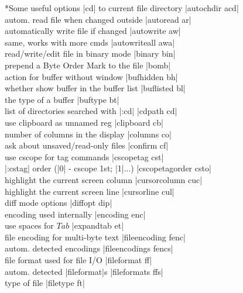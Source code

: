 \documentclass[10pt,a4paper,landscape]{article}
\makeatletter
\renewcommand{\subsection}{\@startsection
	{section}
	{4}
	{0mm}
	{1mm}
	{0.5mm}
	{\normalfont\bfseries\scriptsize}}
\makeatother
\begin{document}
\begin{multicols}{4}
\subsection*{Some useful options}
|cd| to current file directory			\dotfill|autochdir acd|\\
autom. read file when changed outside		\dotfill|autoread ar|\\
automatically write file if changed		\dotfill|autowrite aw|\\
same, works with more cmds			\dotfill|autowriteall awa|\\
read/write/edit file in binary mode		\dotfill|binary bin|\\
prepend a Byte Order Mark to the file		\dotfill|bomb|\\
action for buffer without window		\dotfill|bufhidden bh|\\
whether show buffer in the buffer list		\dotfill|buflisted bl|\\
the type of a buffer				\dotfill|buftype bt|\\
list of directories searched with |:cd|		\dotfill|cdpath cd|\\
use clipboard as unnamed reg			\dotfill|clipboard cb|\\
number of columns in the display		\dotfill|columns co|\\
ask about unsaved/read-only files		\dotfill|confirm cf|\\
use cscope for tag commands			\dotfill|cscopetag cst|\\
|:cstag| order (|0| - cscope 1st; |1|...)	\dotfill|cscopetagorder csto|\\
highlight the current screen column		\dotfill|cursorcolumn cuc|\\
highlight the current screen line		\dotfill|cursorline cul|\\
diff mode options				\dotfill|diffopt dip|\\
encoding used internally			\dotfill|encoding enc|\\
use spaces for $Tab$				\dotfill|expandtab et|\\
file encoding for multi-byte text		\dotfill|fileencoding fenc|\\
autom. detected encodings			\dotfill|fileencodings fencs|\\
file format used for file I/O			\dotfill|fileformat ff|\\
autom. detected |fileformat|s			\dotfill|fileformats ffs|\\
type of file					\dotfill|filetype ft|\\

\end{multicols}
\end{document}
